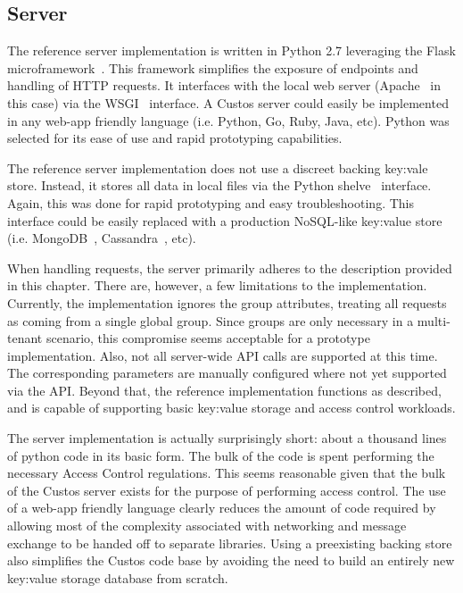 \subsection{Server}

The reference server implementation is written in Python 2.7
leveraging the Flask microframework~\cite{python-flask}. This
framework simplifies the exposure of endpoints and handling of HTTP
requests. It interfaces with the local web server
(Apache~\cite{apache} in this case) via the WSGI~\cite{pep-wsgi}
interface. A Custos server could easily be implemented in any web-app
friendly language (i.e. Python, Go, Ruby, Java, etc). Python was
selected for its ease of use and rapid prototyping capabilities.

The reference server implementation does not use a discreet backing
key:vale store. Instead, it stores all data in local files via the
Python shelve~\cite{python-shelve} interface. Again, this was done for
rapid prototyping and easy troubleshooting. This interface could be
easily replaced with a production NoSQL-like key:value store
(i.e. MongoDB~\cite{mongodb}, Cassandra~\cite{cassandra}, etc).

When handling requests, the server primarily adheres to the
description provided in this chapter. There are, however, a few
limitations to the implementation. Currently, the implementation
ignores the group attributes, treating all requests as coming from a
single global group. Since groups are only necessary in a multi-tenant
scenario, this compromise seems acceptable for a prototype
implementation. Also, not all server-wide API calls are supported at
this time. The corresponding parameters are manually configured where
not yet supported via the API. Beyond that, the reference
implementation functions as described, and is capable of supporting
basic key:value storage and access control workloads.

The server implementation is actually surprisingly short: about a
thousand lines of python code in its basic form. The bulk of the code
is spent performing the necessary Access Control regulations. This
seems reasonable given that the bulk of the Custos server exists for
the purpose of performing access control. The use of a web-app
friendly language clearly reduces the amount of code required by
allowing most of the complexity associated with networking and message
exchange to be handed off to separate libraries. Using a preexisting
backing store also simplifies the Custos code base by avoiding the
need to build an entirely new key:value storage database from scratch.

